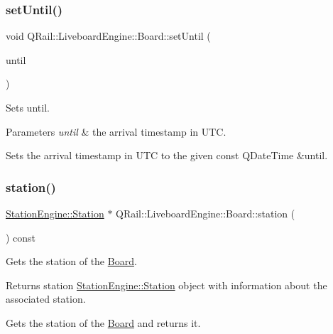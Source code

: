 \subsubsection{\texorpdfstring{setUntil()}{setUntil()}}
{\footnotesize\ttfamily void Q\+Rail\+::\+Liveboard\+Engine\+::\+Board\+::set\+Until (\begin{DoxyParamCaption}\item[{const Q\+Date\+Time \&}]{until }\end{DoxyParamCaption})}



Sets until. 


\begin{DoxyParams}{Parameters}
{\em until} & the arrival timestamp in U\+TC.\\
\hline
\end{DoxyParams}
Sets the arrival timestamp in U\+TC to the given const Q\+Date\+Time \&until. \mbox{\label{classQRail_1_1LiveboardEngine_1_1Board_a96964c52def29a72003eb27701cafe12}} 
\subsubsection{\texorpdfstring{station()}{station()}}
{\footnotesize\ttfamily \mbox{\hyperlink{classQRail_1_1StationEngine_1_1Station}{Station\+Engine\+::\+Station}} $\ast$ Q\+Rail\+::\+Liveboard\+Engine\+::\+Board\+::station (\begin{DoxyParamCaption}{ }\end{DoxyParamCaption}) const}



Gets the station of the \mbox{\hyperlink{classQRail_1_1LiveboardEngine_1_1Board}{Board}}. 

\begin{DoxyReturn}{Returns}
station \mbox{\hyperlink{classQRail_1_1StationEngine_1_1Station}{Station\+Engine\+::\+Station}} object with information about the associated station.
\end{DoxyReturn}
Gets the station of the \mbox{\hyperlink{classQRail_1_1LiveboardEngine_1_1Board}{Board}} and returns it. \mbox{\label{classQRail_1_1LiveboardEngine_1_1Board_ae142ed88bebe608a99f61d09ceacf4b5}} 
